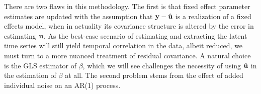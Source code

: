 



 





There are two flaws in this methodology. The first is that fixed effect 
parameter estimates are updated with the assumption that 
$\mathbf{y} - \hat{\mathbf{u}}$ is a realization of a fixed effects model,
when in actuality its covariance structure is altered by the error in estimating $\mathbf{u}$.
As the best-case scenario of estimating and extracting the latent time series will still yield 
temporal correlation in the data, albeit reduced, we must turn to a more nuanced 
treatment of residual covariance. A natural choice is the GLS estimator of $\beta$, 
which we will see challenges the necessity of using $\hat{\mathbf{u}}$ in the estimation of 
$\beta$ at all. The second problem stems from the effect of added individual noise on an AR(1)
process.

